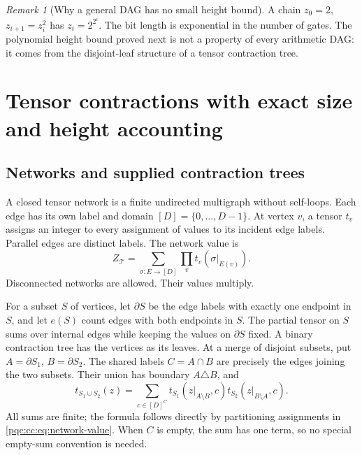 \documentclass[11pt,letterpaper]{article}
\numberwithin{equation}{section}
\theoremstyle{definition}
\theoremstyle{remark}
\newtheorem{remark}[theorem]{Remark}
\newcommand{\srcmark}[1]{\par\noindent{\small\itshape [source~#1]}\par}
\begin{document}
\begin{remark}[Why a general DAG has no small height bound]
A chain $z_0=2$, $z_{i+1}=z_i^2$ has $z_i=2^{2^i}$. The bit length is exponential
in the number of gates. The polynomial height bound proved next is not a
property of every arithmetic DAG: it comes from the disjoint-leaf structure
of a tensor contraction tree.
\end{remark}

\section{Tensor contractions with exact size and height accounting}
\label{pqc:cc:sec:tensors}
\srcmark{10}

\subsection{Networks and supplied contraction trees}

A closed tensor network is a finite undirected multigraph without self-loops.
Each edge has its own label and domain $[D]=\{0,\ldots,D-1\}$. At vertex $v$,
a tensor $t_v$ assigns an integer to every assignment of values to its incident
edge labels. Parallel edges are distinct labels. The network value is
\begin{equation}
 Z_{\mathcal T}=\sum_{\sigma:E\to[D]}\prod_{v}t_v(\sigma|_{E(v)}).
\label{pqc:cc:eq:network-value}
\end{equation}
Disconnected networks are allowed. Their values multiply.

For a subset $S$ of vertices, let $\partial S$ be the edge labels with exactly
one endpoint in $S$, and let $e(S)$ count edges with both endpoints in $S$.
The partial tensor on $S$ sums over internal edges while keeping the values on
$\partial S$ fixed. A binary contraction tree has the vertices as its leaves.
At a merge of disjoint subsets, put $A=\partial S_1$, $B=\partial S_2$.
The shared labels $C=A\cap B$ are precisely the edges joining the two subsets.
Their union has boundary $A\triangle B$, and
\begin{equation}
 t_{S_1\cup S_2}(z)=\sum_{c\in[D]^{C}}
       t_{S_1}(z|_{A\setminus B},c)
       t_{S_2}(z|_{B\setminus A},c).
\label{pqc:cc:eq:merge}
\end{equation}
All sums are finite; the formula follows directly by partitioning assignments
in \eqref{pqc:cc:eq:network-value}. When $C$ is empty, the sum has one term, so no
special empty-sum convention is needed.
\end{document}

